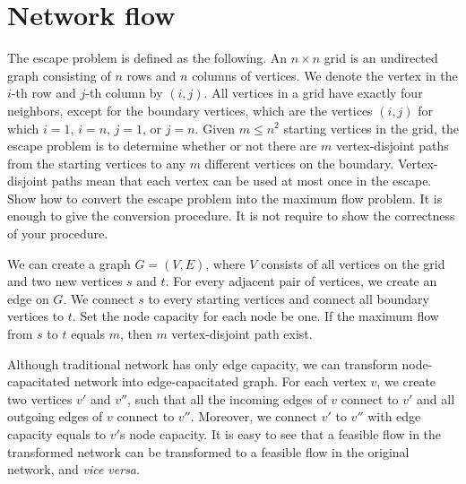 \section{Network flow}
\begin{Exercise}[origin={NTU CSIE 100}]
The escape problem is defined as the following. An $n \times n$ grid is an undirected graph consisting of $n$ rows and $n$ columns of vertices. We denote the vertex in the $i$-th row and $j$-th column by $(i, j)$. All vertices in a grid have exactly four neighbors, except for the boundary vertices, which are the vertices $(i, j)$ for which $i = 1$, $i = n$, $j = 1$, or $j = n$. Given $m \leq n^2$ starting vertices in the grid, the escape problem is to determine whether or not there are $m$ vertex-disjoint paths from the starting vertices to any $m$ different vertices on the boundary. Vertex-disjoint paths mean that each vertex can be used at most once in the escape. Show how to convert the escape problem into the maximum flow problem. It is enough to give the conversion procedure. It is not require to show the correctness of your procedure.
\end{Exercise}
\begin{Answer}
We can create a graph $G = (V, E)$, where $V$ consists of all vertices on the grid and two new vertices $s$ and $t$. For every adjacent pair of vertices, we create an edge on $G$. We connect $s$ to every starting vertices and connect all boundary vertices to $t$. Set the node capacity for each node be one. If the maximum flow from $s$ to $t$ equals $m$, then $m$ vertex-disjoint path exist.

Although traditional network has only edge capacity, we can transform node-capacitated network into edge-capacitated graph. For each vertex $v$, we create two vertices $v'$ and $v''$, such that all the incoming edges of $v$ connect to $v'$ and all outgoing edges of $v$ connect to $v''$. Moreover, we connect $v'$ to $v''$ with edge capacity equals to $v'$s node capacity. It is easy to see that a feasible flow in the transformed network can be transformed to a feasible flow in the original network, and \textit{vice versa}.
\end{Answer}

